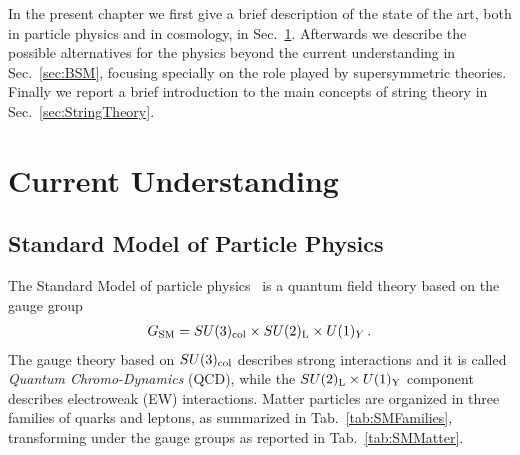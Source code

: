 \documentclass[12pt,a4paper]{book}
\begin{document}
In the present chapter we first give a brief description of the state of the art, both in particle physics and in cosmology, in Sec.~\ref{sec:CurrentUnderstanding}. Afterwards we describe the possible alternatives for the physics beyond the current understanding in Sec.~\ref{sec:BSM}, focusing specially on the role played by supersymmetric theories. Finally we report a brief introduction to the main concepts of string theory in Sec.~\ref{sec:StringTheory}.\\


\section{Current Understanding}
\label{sec:CurrentUnderstanding}

\subsection{Standard Model of Particle Physics}
\label{ssec:StandardModel}

The Standard Model of particle physics~\cite{Agashe:2014kda} is a quantum field theory based on the gauge group
\begin{align}
\label{eq:SMGaugeGroup}
G_{\rm SM} = SU(3)_{\rm col} \times SU(2)_{\rm L} \times U(1)_{Y}\,.
\end{align}
The gauge theory based on $SU(3)_{\rm col}$ describes strong interactions and it is called \textit{Quantum Chromo-Dynamics} (QCD), while the $SU(2)_{\rm L} \times U(1)_{\rm Y}$ component describes electroweak (EW) interactions. Matter particles are organized in three families of quarks and leptons, as summarized in Tab.~\ref{tab:SMFamilies}, transforming under the gauge groups as reported in Tab.~\ref{tab:SMMatter}.\\
\end{document}
